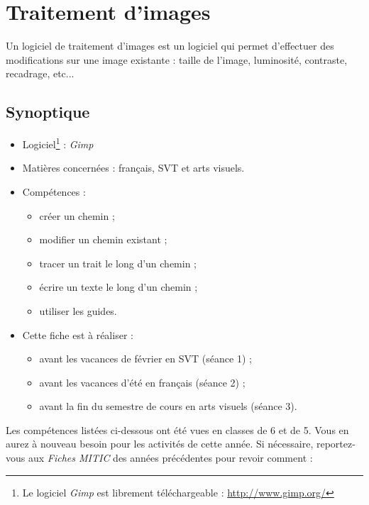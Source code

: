 \chapter{Traitement d'images}  

Un logiciel de traitement d'images est un logiciel qui permet d'effectuer des modifications sur une image existante : taille de l'image, luminosité, contraste, recadrage, etc...

{\footnotesize
\section*{Synoptique}
\begin{itemize}
\item Logiciel\footnote{Le logiciel \emph{Gimp} est librement téléchargeable : \url{http://www.gimp.org/}} : \emph{Gimp}
\item Matières concernées : français, SVT et arts visuels.
\item Compétences : 
        \begin{itemize}
        \item créer un chemin ;
	\item modifier un chemin existant ;
	\item tracer un trait le long d'un chemin ;
	\item écrire un texte le long d'un chemin ;
	\item utiliser les guides.
        \end{itemize}
\item Cette fiche est à réaliser :
        \begin{itemize}
	\item avant les vacances de février en SVT (séance 1) ;
        \item avant les vacances d'été en français (séance 2) ;
        \item avant la fin du semestre de cours en arts visuels (séance 3).
        \end{itemize}
\end{itemize}
}


\vspace{12pt}

Les compétences listées ci-dessous ont été vues en classes de 6 et de 5. Vous en aurez à nouveau besoin pour les activités de cette année. Si nécessaire, reportez-vous aux \emph{Fiches MITIC} des années précédentes pour revoir comment :  

